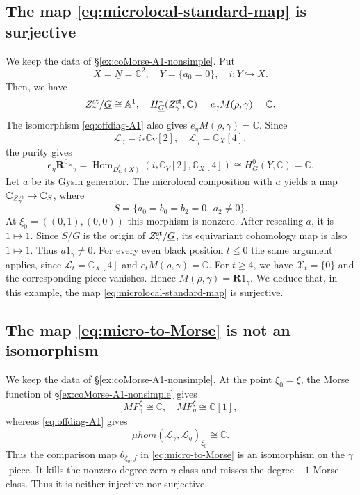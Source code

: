 \documentclass[11pt,reqno]{amsart}
\theoremstyle{definition}
\theoremstyle{remark}
\def\bbC{\mathbb C}
\def\dN{\underline N}
\def\dG{\underline G}
\def\scrX{\mathscr X}
\def\Hom{\operatorname{Hom}}
\def\muhom{\mu hom}
\def\bR{\mathbf R}
\begin{document}
\subsection{The map \eqref{eq:microlocal-standard-map} is surjective}
\label{subsec:A1-gysin}
We keep the data of \S\ref{ex:coMorse-A1-nonsimple}.
Put
$$X=\dN=\bbC^2
,\quad
Y=\{a_0=0\}
,\quad
i:Y\hookrightarrow X.$$
Then, we have 
$$Z_\gamma^{\rm st}/{\dG}\cong\mathbb A^1
,\quad
H_{\dG}^*(Z_\gamma^{\rm st},\bbC)=e_\gamma M(\rho,\gamma)=\bbC.$$
The isomorphism \eqref{eq:offdiag-A1} also gives $e_\eta M(\rho,\gamma)=\bbC$.
Since 
$$\mathscr L_\gamma=i_*\bbC_Y[2],\quad
\mathscr L_\eta=\bbC_X[4],$$
the purity gives
\[
 e_\eta\bR^0e_\gamma
 =\Hom_{D_{\dG}^b(X)}(i_*\bbC_Y[2],\bbC_X[4])
 \cong H_{\dG}^0(Y,\bbC)=\bbC.
\]
Let $a$ be its Gysin generator. 
The microlocal composition with $a$ yields a map
$\bbC_{Z_\gamma^{\rm st}}\to\bbC_S$, where
$$S=\{a_0=b_0=b_2=0,\ a_2\ne0\}.$$
At $\xi_0=((0,1),(0,0))$ this morphism is nonzero. After rescaling $a$, it is
$1\mapsto1$. Since $S/\dG$ is the origin of $Z_\gamma^{\rm st}/\dG$,
its equivariant cohomology map is also $1\mapsto1$. Thus $a1_\gamma\ne0$.
For every even black position $t\leqslant0$ the same argument applies,
since $\mathscr L_t=\bbC_X[4]$ and $e_tM(\rho,\gamma)=\bbC$.
For $t\geqslant4$, we have $\scrX_t=\{0\}$ and the corresponding piece vanishes.
Hence $M(\rho,\gamma)=\bR1_\gamma$.
We deduce that, in this example, the map
\eqref{eq:microlocal-standard-map} is surjective.


\subsection{The map \eqref{eq:micro-to-Morse} is not an isomorphism}
\label{sec:micro-to-Morse}
We keep the data of \S\ref{ex:coMorse-A1-nonsimple}.
At the point $\xi_0=\xi$, the Morse function of \S\ref{ex:coMorse-A1-nonsimple} gives
$$MF^\xi_\gamma\cong\bbC,\quad
MF^\xi_\eta\cong\bbC[1],$$
whereas
\eqref{eq:offdiag-A1} gives
$$\muhom(\mathscr L_\gamma,\mathscr L_\eta)_{\xi_0}\cong\bbC.$$
Thus the comparison map $\theta_{\xi_0,f}$ in
\eqref{eq:micro-to-Morse} is an isomorphism on the $\gamma$-piece.
It kills the nonzero degree zero $\eta$-class and misses the degree $-1$ Morse class. 
Thus it is neither injective nor surjective.
\end{document}
